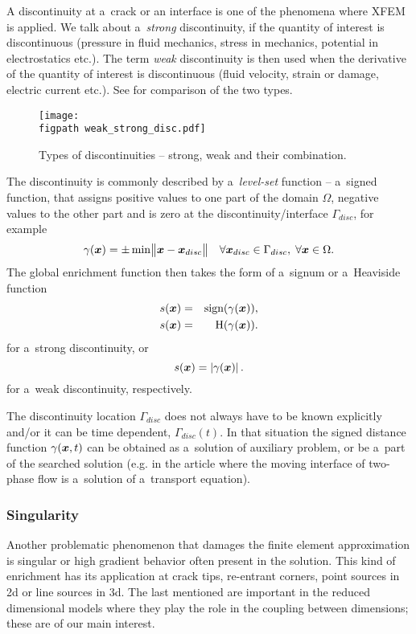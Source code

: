 A discontinuity at a~crack or an interface is one of the phenomena where XFEM is applied.
We talk about a~\emph{strong} discontinuity, if the quantity of interest is discontinuous (pressure in fluid mechanics, stress in mechanics, potential in electrostatics etc.).
The term \emph{weak} discontinuity is then used when the derivative of the quantity of interest is discontinuous (fluid velocity, strain or damage, electric current etc.). See  for comparison of the two types.
%
\begin{figure}[!htb]
  \centering    
    \texttt{[image: \\figpath weak\_strong\_disc.pdf]}
  \caption[Types of discontinuities]{Types of discontinuities -- strong, weak and their combination. }
  \label{fig:types_of_discontinuities}
\end{figure}

The discontinuity is commonly described by a~\emph{level-set} function -- a~signed function,
that assigns positive values to one part of the domain $\Omega$, negative values to the other part and is zero at the discontinuity/interface $\Gamma_{disc}$, for example
\begin{equation}
    \gamma(\mathbf{\boldsymbol{x}}) = \pm \min \bigl\Vert\mathbf{\boldsymbol{x}}-\mathbf{\boldsymbol{x}}_{disc}\bigr\Vert \quad \forall \mathbf{\boldsymbol{x}}_{disc} \in \Gamma_{disc},\; \forall \mathbf{\boldsymbol{x}} \in \Omega.
\end{equation}
The global enrichment function then takes the form of a~signum or a~Heaviside function
\begin{eqnarray}
    s(\mathbf{\boldsymbol{x}}) &=& \textrm{sign}(\gamma(\mathbf{\boldsymbol{x}})),\\
    s(\mathbf{\boldsymbol{x}}) &=& \textrm{H}(\gamma(\mathbf{\boldsymbol{x}})).
\end{eqnarray}
for a~strong discontinuity, or
\begin{equation}
    s(\mathbf{\boldsymbol{x}}) = \left|\gamma(\mathbf{\boldsymbol{x}})\right|.
\end{equation}
for a~weak discontinuity, respectively.

The discontinuity location $\Gamma_{disc}$ does not always have to be known explicitly and/or it can be time dependent, $\Gamma_{disc}(t)$.
In that situation the signed distance function $\gamma(\mathbf{\boldsymbol{x}},t)$ can be obtained as a~solution of auxiliary problem, or be a~part of
the searched solution (e.g. in the article \cite{sauerland_stable_2013}
where the moving interface of two-phase flow is a~solution of a~transport equation).


\subsubsection{Singularity} \label{sec:glob_enr_singularity}
Another problematic phenomenon that damages the finite element approximation is singular or high gradient behavior often present in the solution.
This kind of enrichment has its application at crack tips, re-entrant corners, point sources in 2d or line sources in 3d.
The last mentioned are important in the reduced dimensional models where they play the role in the coupling between dimensions;
these are of our main interest.

